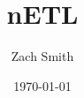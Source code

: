 \documentclass[
    parskip=full,
    a4paper
]{scrartcl}
\title{nETL}
\author{Zach Smith}
\date{\today}
\begin{document}
\maketitle
\newpage

\tableofcontents
\newpage




\newpage

\begin{appendix}
    \listoffigures
    \listoftables
\end{appendix}
\newpage




\end{document}
